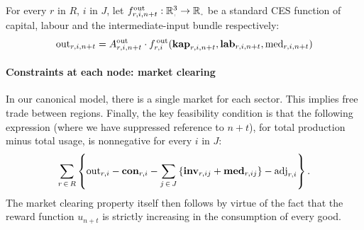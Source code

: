 \documentclass[12pt,a4paper,twoside, draft]{article}
\begin{document}
For every $r$ in $R$, $i$ in $J$, let
$f_{r, i, n + t}^{\textup{out}}: \nnreal^{3} \rightarrow \nnreal$ be a standard
CES function of capital, labour and the intermediate-input bundle respectively:
\begin{equation}
	\textup{out}_{r, i, n + t}
    = A_{r, i, n + t} ^ \textup{out} \cdot f_{r, i}
      ^ \textup{\,out}(
        \mathbf{kap}_{r, i, n + t},
        \mathbf{lab}_{r, i, n + t},
        \textup{med}_{r, i, n + t}
        )
\end{equation}
\paragraph{Constraints at each node: market clearing}
In our canonical model, there is a single market for each sector.
This implies free trade between regions.
Finally, the key feasibility condition is that the following expression (where
we have suppressed reference to $n + t$), for total production minus total
usage, is nonnegative for every $i$ in $J$:
\begin{equation}
  \sum_{r \,\in\, R} \left\{
  \textup{out}_{r, i}
  - \mathbf{con}_{r, i}
  - \sum_{j \,\in\, J}
      \left\{\mathbf{inv}_{r, ij} + \mathbf{med}_{r, ij}\right\}
  - \textup{adj}_{r, i} \right\}.
\end{equation}
The market clearing property itself then follows by virtue of the fact that
the reward function $u_{n + t}$ is strictly increasing in the
consumption of every good.
\end{document}
